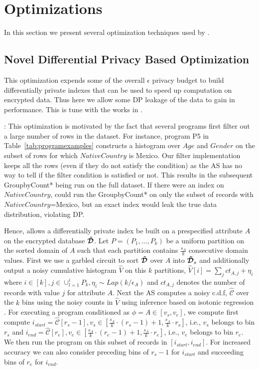 \section{\system Optimizations}\label{sec:optimization}
In this section we present several optimization techniques used by \system. %
\vspace{-0.2cm}\subsection{Novel \system Differential Privacy Based Optimization}\label{sec:dp_optimization}
This optimization expends some of the overall $\epsilon$ privacy budget to build differentially private indexes that can be used to speed up computation on encrypted data. Thus here we allow some DP leakage of the data to gain in performance. This is tune with the works in \cite{Mazloom:2018:SCD,He:2017:RecordLinkage,Chan:2019:FDO:3310435.3310585,Groce}.  

: This optimization is motivated by the fact that several programs first filter out a large number of rows in the dataset. For instance, program  P5 in Table~\ref{tab:programexamples} constructs a histogram over $Age$ and $Gender$ on the subset of rows for which $NativeCountry$ is Mexico. Our filter implementation keeps all the rows (even if they do not satisfy the condition) as the \textsf{AS} has no way to tell if the filter condition is satisfied or not. This results in the subsequent GroupbyCount* being run on the full dataset. If there were an index on $NativeCountry$,  \system could run the GroupbyCount* on only the subset of records with $NativeCountry$=Mexico, but an exact index would leak the true data distribution, violating DP. 

Hence, \system allows a differentially private index be built on a prespecified attribute $A$ on the encrypted database $\boldsymbol{\tilde{\mathcal{D}}}$.   Let $P=(P_1,\ldots,P_k)$ be a uniform partition on the sorted domain of $A$ such that each partition contains $\frac{s_A}{k}$ consecutive domain values. First we use a garbled circuit to sort $\boldsymbol{\tilde{\mathcal{D}}}$ over $A$ into $\boldsymbol{\tilde{\mathcal{D}}}_s$ and additionally output a noisy cumulative histogram $\hat{V}$ on this $k$ partitions, $\hat{V}[i]=\sum_j ct_{A,j}+\eta_i$ where $i \in [k], j \in \cup_{l=1}^i P_k, \eta_i\sim Lap(k/\epsilon_A)$ and $ct_{A,j}$ denotes the number of records with value $j$ for attribute $A$. 
Next the \textsf{AS} computes a noisy c.d.f, $\hat{\mathcal{C}}$ over the $k$ bins using the noisy counts in $\hat{V}$ using inference based on isotonic regression \cite{cdf}. For executing a program conditioned as $\phi=A \in [v_s,v_e]$, we compute first compute $i_{start}=\hat{\mathcal{C}}[r_s-1], v_s \in [\frac{s_A}{k}\cdot(r_s-1)+1,\frac{s_A}{k}\cdot r_s]$, i.e., $v_s$ belongs to bin $r_s$   and  $i_{end}=\hat{\mathcal{C}}[r_e], v_e \in [\frac{s_A}{k}\cdot(r_e-1)+1,\frac{s_A}{k}\cdot r_e]$, i.e., $v_e$ belongs to bin $r_e$. We then run the program on this subset of records in $[i_{start},i_{end}]$. For increased accuracy we can also consider preceding bins of $r_s-1$ for $i_{start}$ and succeeding bins of $r_e$ for $i_{end}$.

